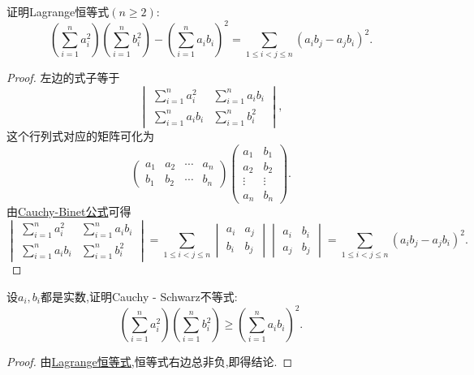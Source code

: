 \documentclass[../../main.tex]{subfiles}
\begin{document}
\begin{lemma}[Lagrange恒等式]\label{lemma:Lagrange恒等式}
证明Lagrange恒等式\((n\geqslant 2)\):
\[
\left(\sum_{i = 1}^{n}a_i^2\right)\left(\sum_{i = 1}^{n}b_i^2\right)-\left(\sum_{i = 1}^{n}a_ib_i\right)^2=\sum_{1\leqslant  i<j\leqslant  n}(a_ib_j - a_jb_i)^2.
\]
\end{lemma}
\begin{proof}
左边的式子等于
\[
\begin{vmatrix}
\sum_{i = 1}^{n}a_i^2 & \sum_{i = 1}^{n}a_ib_i\\
\sum_{i = 1}^{n}a_ib_i & \sum_{i = 1}^{n}b_i^2
\end{vmatrix},
\]
这个行列式对应的矩阵可化为
\[
\begin{pmatrix}
a_1 & a_2 & \cdots & a_n\\
b_1 & b_2 & \cdots & b_n
\end{pmatrix}
\begin{pmatrix}
a_1 & b_1\\
a_2 & b_2\\
\vdots & \vdots\\
a_n & b_n
\end{pmatrix}.
\]
由\hyperref[theorem:Cauchy-Binet公式]{Cauchy-Binet公式}可得
\[
\begin{vmatrix}
\sum\limits_{i = 1}^{n}a_i^2 & \sum\limits_{i = 1}^{n}a_ib_i\\
\sum\limits_{i = 1}^{n}a_ib_i & \sum\limits_{i = 1}^{n}b_i^2
\end{vmatrix}
=\sum_{1\leqslant  i<j\leqslant  n}
\begin{vmatrix}
a_i & a_j\\
b_i & b_j
\end{vmatrix}
\begin{vmatrix}
a_i & b_i\\
a_j & b_j
\end{vmatrix}
=\sum_{1\leqslant  i<j\leqslant  n}(a_ib_j - a_jb_i)^2.
\]  
\end{proof}

\begin{theorem}\label{theorem:Cauchy - Schwarz不等式}
设\(a_i,b_i\)都是实数,证明Cauchy - Schwarz不等式:
\[
\left(\sum_{i = 1}^{n}a_i^2\right)\left(\sum_{i = 1}^{n}b_i^2\right)\geqslant \left(\sum_{i = 1}^{n}a_ib_i\right)^2.
\]
\end{theorem}
\begin{proof}
由\hyperref[lemma:Lagrange恒等式]{Lagrange恒等式},恒等式右边总非负,即得结论.
\end{proof}
\end{document}
